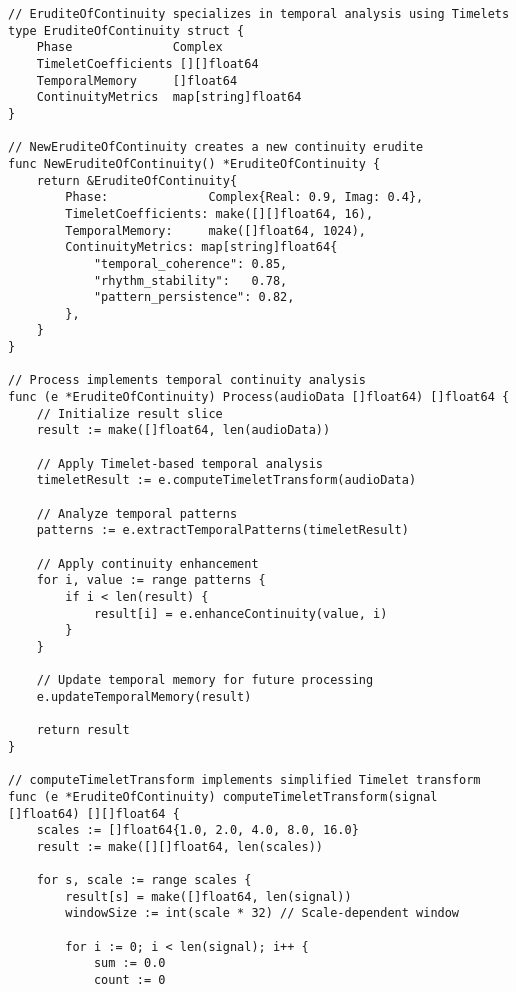 \begin{tcolorbox}[colback=CodeBackground, colframe=DarkGray, title=Erudite of Continuity Implementation, fonttitle=\bfseries]
\begin{verbatim}
// EruditeOfContinuity specializes in temporal analysis using Timelets
type EruditeOfContinuity struct {
    Phase              Complex
    TimeletCoefficients [][]float64
    TemporalMemory     []float64
    ContinuityMetrics  map[string]float64
}

// NewEruditeOfContinuity creates a new continuity erudite
func NewEruditeOfContinuity() *EruditeOfContinuity {
    return &EruditeOfContinuity{
        Phase:              Complex{Real: 0.9, Imag: 0.4},
        TimeletCoefficients: make([][]float64, 16),
        TemporalMemory:     make([]float64, 1024),
        ContinuityMetrics: map[string]float64{
            "temporal_coherence": 0.85,
            "rhythm_stability":   0.78,
            "pattern_persistence": 0.82,
        },
    }
}

// Process implements temporal continuity analysis
func (e *EruditeOfContinuity) Process(audioData []float64) []float64 {
    // Initialize result slice
    result := make([]float64, len(audioData))
    
    // Apply Timelet-based temporal analysis
    timeletResult := e.computeTimeletTransform(audioData)
    
    // Analyze temporal patterns
    patterns := e.extractTemporalPatterns(timeletResult)
    
    // Apply continuity enhancement
    for i, value := range patterns {
        if i < len(result) {
            result[i] = e.enhanceContinuity(value, i)
        }
    }
    
    // Update temporal memory for future processing
    e.updateTemporalMemory(result)
    
    return result
}

// computeTimeletTransform implements simplified Timelet transform
func (e *EruditeOfContinuity) computeTimeletTransform(signal []float64) [][]float64 {
    scales := []float64{1.0, 2.0, 4.0, 8.0, 16.0}
    result := make([][]float64, len(scales))
    
    for s, scale := range scales {
        result[s] = make([]float64, len(signal))
        windowSize := int(scale * 32) // Scale-dependent window
        
        for i := 0; i < len(signal); i++ {
            sum := 0.0
            count := 0
            

\end{verbatim}
\end{tcolorbox}

